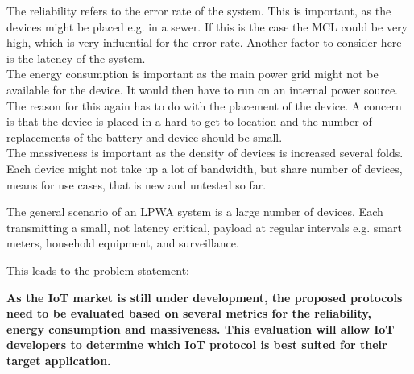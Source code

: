 The reliability refers to the error rate of the system. This is important, as the devices might be placed e.g. in a sewer. If this is the case the \gls{MCL} could be very high, which is very influential for the error rate. Another factor to consider here is the latency of the system.\\
The energy consumption is important as the main power grid might not be available for the device. It would then have to run on an internal power source. The reason for this again has to do with the placement of the device. A concern is that the device is placed in a hard to get to location and the number of replacements of the battery and device should be small.\\
The massiveness is important as the density of devices is increased several folds. Each device might not take up a lot of bandwidth, but share number of devices, means for use cases, that is new and untested so far.

The general scenario of an LPWA system is a large number of devices. Each transmitting a small, not latency critical, payload at regular intervals e.g. smart meters, household equipment, and surveillance. %



This leads to the problem statement:
\begin{center}
\textbf{As the IoT market is still under development, the proposed protocols need to be evaluated based on several metrics for the reliability, energy consumption and massiveness. This evaluation will allow IoT developers to determine which IoT protocol is best suited for their target application.}
\end{center}

